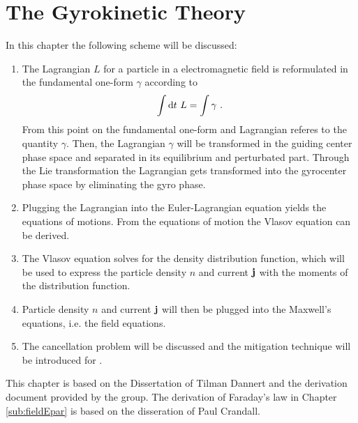 
\chapter{The Gyrokinetic Theory}
\label{chap:derivationGyrokineticEq}

\thispagestyle{empty}
\newpage

\bigskip
In this chapter the following scheme will be discussed:
\begin{enumerate}
    \item The Lagrangian $L$ for a particle in a electromagnetic field is reformulated in the fundamental one-form $\gamma$ according to 
        \begin{gather}
            \int \mathrm{d}t ~ L = \int \gamma~.
        \end{gather}
        From this point on the fundamental one-form and Lagrangian referes to the quantity $\gamma$. Then, the Lagrangian $\gamma$ will be transformed in the guiding center phase space and separated in its equilibrium and perturbated part. Through the Lie transformation the Lagrangian gets transformed into the gyrocenter phase space by eliminating the gyro phase. 
    \item Plugging the Lagrangian into the Euler-Lagrangian equation yields the equations of motions. From the equations of motion the Vlasov equation can be derived.
    \item The Vlasov equation solves for the density distribution function, which will be used to express the particle density $n$ and current $\boldsymbol{\mathbf{j}}$ with the moments of the distribution function. 
    \item Particle density $n$ and current $\boldsymbol{\mathbf{j}}$ will then be plugged into the Maxwell's equations, i.e. the field equations.
    \item The cancellation problem will be discussed and the mitigation technique will be introduced for {\gkw}.
\end{enumerate}

This chapter is based on the Dissertation of Tilman Dannert\cite{Dannert_PHD} and the derivation document provided by the {\gkw} group\cite{GKWDerivation}. The derivation of Faraday's law in Chapter \ref{sub:fieldEpar} is based on the disseration of Paul Crandall\cite{Crandall_PHD}.

\newpage